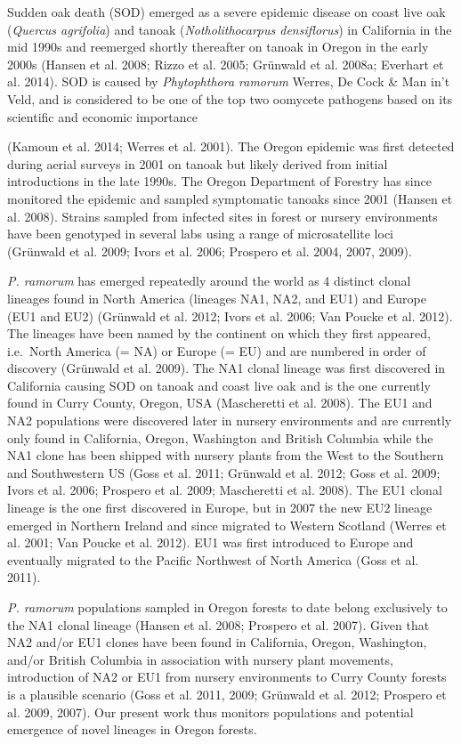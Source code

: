 \documentclass[double,12pt]{beavtex}
\begin{document}
  Sudden oak death (SOD) emerged as a severe epidemic disease on coast
  live oak (\emph{Quercus agrifolia}) and tanoak (\emph{Notholithocarpus
  densiflorus}) in California in the mid 1990s and reemerged shortly
  thereafter on tanoak in Oregon in the early 2000s (Hansen et al. 2008;
  Rizzo et al. 2005; Grünwald et al. 2008a; Everhart et al. 2014). SOD is
  caused by \emph{Phytophthora ramorum} Werres, De Cock \& Man in't Veld,
  and is considered to be one of the top two oomycete pathogens based on
  its scientific and economic importance
  
  (Kamoun et al. 2014; Werres et al. 2001). The Oregon epidemic was first
  detected during aerial surveys in 2001 on tanoak but likely derived from
  initial introductions in the late 1990s. The Oregon Department of
  Forestry has since monitored the epidemic and sampled symptomatic
  tanoaks since 2001 (Hansen et al. 2008). Strains sampled from infected
  sites in forest or nursery environments have been genotyped in several
  labs using a range of microsatellite loci (Grünwald et al. 2009; Ivors
  et al. 2006; Prospero et al. 2004, 2007, 2009).
  
  \emph{P. ramorum} has emerged repeatedly around the world as 4 distinct
  clonal lineages found in North America (lineages NA1, NA2, and EU1) and
  Europe (EU1 and EU2) (Grünwald et al. 2012; Ivors et al. 2006; Van
  Poucke et al. 2012). The lineages have been named by the continent on
  which they first appeared, i.e.~North America (= NA) or Europe (= EU)
  and are numbered in order of discovery (Grünwald et al. 2009). The NA1
  clonal lineage was first discovered in California causing SOD on tanoak
  and coast live oak and is the one currently found in Curry County,
  Oregon, USA (Mascheretti et al. 2008). The EU1 and NA2 populations were
  discovered later in nursery environments and are currently only found in
  California, Oregon, Washington and British Columbia while the NA1 clone
  has been shipped with nursery plants from the West to the Southern and
  Southwestern US (Goss et al. 2011; Grünwald et al. 2012; Goss et al.
  2009; Ivors et al. 2006; Prospero et al. 2009; Mascheretti et al. 2008).
  The EU1 clonal lineage is the one first discovered in Europe, but in
  2007 the new EU2 lineage emerged in Northern Ireland and since migrated
  to Western Scotland (Werres et al. 2001; Van Poucke et al. 2012). EU1
  was first introduced to Europe and eventually migrated to the Pacific
  Northwest of North America (Goss et al. 2011).
  
  \emph{P. ramorum} populations sampled in Oregon forests to date belong
  exclusively to the NA1 clonal lineage (Hansen et al. 2008; Prospero et
  al. 2007). Given that NA2 and/or EU1 clones have been found in
  California, Oregon, Washington, and/or British Columbia in association
  with nursery plant movements, introduction of NA2 or EU1 from nursery
  environments to Curry County forests is a plausible scenario (Goss et
  al. 2011, 2009; Grünwald et al. 2012; Prospero et al. 2009, 2007). Our
  present work thus monitors populations and potential emergence of novel
  lineages in Oregon forests.
  
\end{document}
